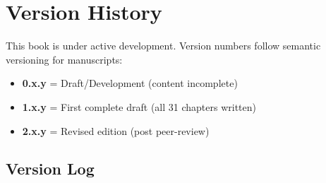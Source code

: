 \chapter*{Version History}

\begingroup
\sloppy

This book is under active development. Version numbers follow semantic versioning for manuscripts:
\begin{itemize}
\item \textbf{0.x.y} = Draft/Development (content incomplete)
\item \textbf{1.x.y} = First complete draft (all 31 chapters written)
\item \textbf{2.x.y} = Revised edition (post peer-review)
\end{itemize}

\section*{Version Log}


